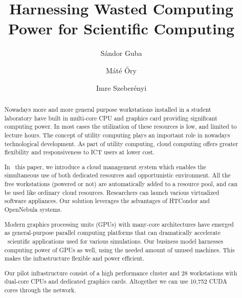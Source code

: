 \documentclass{llncs}
\begin{document}
%
\mainmatter              %
%
\title{Harnessing Wasted Computing Power for
Scientific Computing}
%
%
\author{S\'andor Guba \and M\'at\'e \H{O}ry \and Imre Szeber\'enyi}
%
%
%

\maketitle              %

\begin{abstract}
Nowadays more and more general purpose workstations installed in a student
laboratory have built in multi-core CPU and graphics card providing significant
computing power. In most cases the utilization of these resources is low, and
limited to lecture hours. The concept of utility computing plays an important
role in nowadays technological development. As part of utility computing, cloud
computing offers greater flexibility and responsiveness to ICT users at lower
cost.

In  this paper, we introduce a cloud management system which enables the
simultaneous use of both dedicated resources and opportunistic environment. All
the free workstations (powered or not) are automatically added to a resource
pool, and can be used like ordinary cloud resources. Researchers can launch
various virtualized software appliances. Our solution leverages the advantages
of HTCondor and OpenNebula systems.

Modern graphics processing units (GPUs) with many-core architectures have
emerged as general-purpose parallel computing platforms that can dramatically
accelerate  scientific applications used for various simulations. Our business
model harnesses computing power of GPUs as well, using the needed amount of
unused machines. This makes the infrastructure flexible and power efficient.

Our pilot infrastructure consist of a high performance cluster and 28
workstations with dual-core CPUs and dedicated graphics cards. Altogether we
can use 10,752 CUDA cores through the network.

\end{abstract}
%
\end{document}
